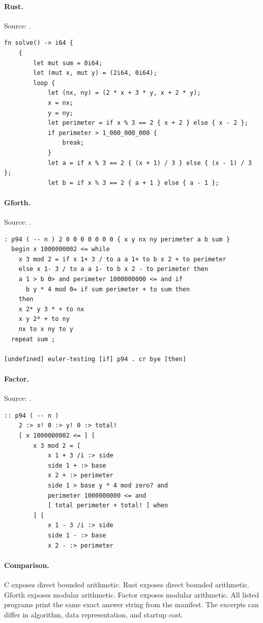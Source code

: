 \paragraph{Rust.} Source: .
\begin{lstlisting}
fn solve() -> i64 {
    {
        let mut sum = 0i64;
        let (mut x, mut y) = (2i64, 0i64);
        loop {
            let (nx, ny) = (2 * x + 3 * y, x + 2 * y);
            x = nx;
            y = ny;
            let perimeter = if x % 3 == 2 { x + 2 } else { x - 2 };
            if perimeter > 1_000_000_000 {
                break;
            }
            let a = if x % 3 == 2 { (x + 1) / 3 } else { (x - 1) / 3 };
            let b = if x % 3 == 2 { a + 1 } else { a - 1 };
\end{lstlisting}

\paragraph{Gforth.} Source: .
\begin{lstlisting}
: p94 ( -- n ) 2 0 0 0 0 0 0 0 { x y nx ny perimeter a b sum }
  begin x 1000000002 <= while
    x 3 mod 2 = if x 1+ 3 / to a a 1+ to b x 2 + to perimeter
    else x 1- 3 / to a a 1- to b x 2 - to perimeter then
    a 1 > b 0> and perimeter 1000000000 <= and if
      b y * 4 mod 0= if sum perimeter + to sum then
    then
    x 2* y 3 * + to nx
    x y 2* + to ny
    nx to x ny to y
  repeat sum ;

[undefined] euler-testing [if] p94 . cr bye [then]
\end{lstlisting}

\paragraph{Factor.} Source: .
\begin{lstlisting}
:: p94 ( -- n )
    2 :> x! 0 :> y! 0 :> total!
    [ x 1000000002 <= ] [
        x 3 mod 2 = [
            x 1 + 3 /i :> side
            side 1 + :> base
            x 2 + :> perimeter
            side 1 > base y * 4 mod zero? and
            perimeter 1000000000 <= and
            [ total perimeter + total! ] when
        ] [
            x 1 - 3 /i :> side
            side 1 - :> base
            x 2 - :> perimeter
\end{lstlisting}

\paragraph{Comparison.}
C exposes direct bounded arithmetic. Rust exposes direct bounded arithmetic. Gforth exposes modular arithmetic. Factor exposes modular arithmetic.
All listed programs print the same exact answer string from the manifest. The excerpts can differ in algorithm, data representation, and startup cost.

